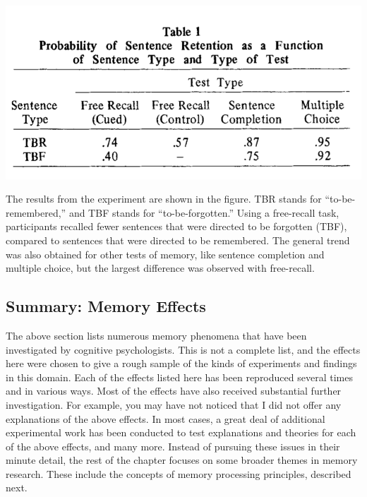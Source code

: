 \documentclass[
  oneside,
  12pt]{crumpbook}
\newenvironment{floatright50}{%
  \wrapfigure{R}{.5\textwidth}%
  }{%
  \endwrapfigure}
\begin{document}
\begin{floatright50}
\includegraphics[width=1\linewidth]{imgs/Direct_forgetting}

\end{floatright50}

The results from the experiment are shown in the figure. TBR stands for ``to-be-remembered,'' and TBF stands for ``to-be-forgotten.'' Using a free-recall task, participants recalled fewer sentences that were directed to be forgotten (TBF), compared to sentences that were directed to be remembered. The general trend was also obtained for other tests of memory, like sentence completion and multiple choice, but the largest difference was observed with free-recall.

\hypertarget{summary-memory-effects}{%
\subsection{Summary: Memory Effects}\label{summary-memory-effects}}

The above section lists numerous memory phenomena that have been investigated by cognitive psychologists. This is not a complete list, and the effects here were chosen to give a rough sample of the kinds of experiments and findings in this domain. Each of the effects listed here has been reproduced several times and in various ways. Most of the effects have also received substantial further investigation. For example, you may have not noticed that I did not offer any explanations of the above effects. In most cases, a great deal of additional experimental work has been conducted to test explanations and theories for each of the above effects, and many more. Instead of pursuing these issues in their minute detail, the rest of the chapter focuses on some broader themes in memory research. These include the concepts of memory processing principles, described next.
\end{document}
